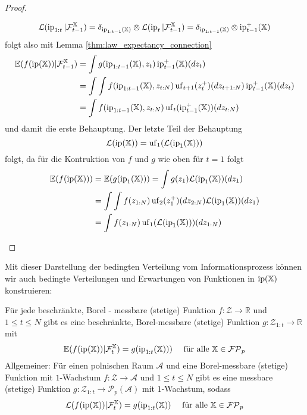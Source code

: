 \begin{proof}
\begin{enumerate}[(i)]
    $$\mathcal{L}(\operatorname{ip}_{1:t}\vert \mathcal{F}_{t-1}^\mathbb{X})=\delta_{\operatorname{ip}_{1:t-1}(\mathbb{X})}\otimes \mathcal{L}(\operatorname{ip}_t\vert \mathcal{F}_{t-1}^\mathbb{X})=\delta_{\operatorname{ip}_{1:t-1}(\mathbb{X})}\otimes \operatorname{ip}_{t-1}^+(\mathbb{X})$$
    folgt also mit Lemma \ref{thm:law_expectancy_connection}
    \begin{align*}
    \mathbb{E}(f(\operatorname{ip}(\mathbb{X}))\vert \mathcal{F}_{t-1}^\mathbb{X}) &= \int g(\operatorname{ip}_{1:t-1}(\mathbb{X}), z_t) \operatorname{ip}_{t-1}^+(\mathbb{X})(dz_t) \\
    &= \int \int f(\operatorname{ip}_{1:t-1}(\mathbb{X}), z_{t:N}) \operatorname{uf}_{t+1}(z_t^+)(dz_{t+1:N})\operatorname{ip}_{t-1}^+(\mathbb{X})(dz_t) \\
    &= \int f(\operatorname{ip}_{1:t-1}(\mathbb{X}), z_{t:N}) \operatorname{uf}_{t}(\operatorname{ip}_{t-1}^+(\mathbb{X}))(dz_{t:N})
    \end{align*}
    und damit die erste Behauptung.
    Der letzte Teil der Behauptung
    $$\mathcal{L}(\operatorname{ip}(\mathbb{X}))=\operatorname{uf}_1(\mathcal{L}(\operatorname{ip}_1(\mathbb{X})))$$
    folgt, da für die Kontruktion von $f$ und $g$ wie oben für $t=1$ folgt
    \begin{align*}
        \mathbb{E}(f(\operatorname{ip}(\mathbb{X}))) &= \mathbb{E}(g(\operatorname{ip}_1(\mathbb{X}))) = \int g(z_1) \mathcal{L}(\operatorname{ip}_1(\mathbb{X}))(dz_1) \\
        &= \int \int f(z_{1:N}) \operatorname{uf}_{2}(z_1^+)(dz_{2:N}) \mathcal{L}(\operatorname{ip}_1(\mathbb{X}))(dz_1) \\
        &= \int f(z_{1:N}) \operatorname{uf}_1(\mathcal{L}(\operatorname{ip}_1(\mathbb{X})))(dz_{1:N})
    \end{align*}
\end{enumerate}
\end{proof}
Mit dieser Darstellung der bedingten Verteilung vom Informationsprozess können wir auch bedingte Verteilungen und Erwartungen von Funktionen in $\operatorname{ip}(\mathbb{X})$ konstruieren:
\begin{lemma}\label{thm:self_awareness}
Für jede beschränkte, Borel - messbare (stetige) Funktion $f:\mathcal{Z}\rightarrow \mathbb{R}$ und $1\leq t\leq N$ gibt es eine beschränkte, Borel-messbare (stetige) Funktion $g:\mathcal{Z}_{1:t}\rightarrow \mathbb{R}$ mit 
$$\mathbb{E}(f(\operatorname{ip}(\mathbb{X}))\vert \mathcal{F}_t^\mathbb{X}) = g(\operatorname{ip}_{1:t}(\mathbb{X}))) \quad \text{ für alle }\mathbb{X}\in\mathcal{FP}_p$$
Allgemeiner: Für einen polnischen Raum $\mathcal{A}$ und eine Borel-messbare (stetige) Funktion mit $1$-Wachstum $f:\mathcal{Z}\rightarrow \mathcal{A}$ und $1\leq t\leq N$ gibt es eine messbare (stetige) Funktion $g:\mathcal{Z}_{1:t}\rightarrow \mathcal{P}_p(\mathcal{A})$ mit $1$-Wachstum, sodass
$$\mathcal{L}(f(\operatorname{ip}(\mathbb{X}))\vert \mathcal{F}_t^\mathbb{X})=g(\operatorname{ip}_{1:t}(\mathbb{X}))\quad\text{ für alle } \mathbb{X}\in\mathcal{FP}_p$$
\end{lemma}
